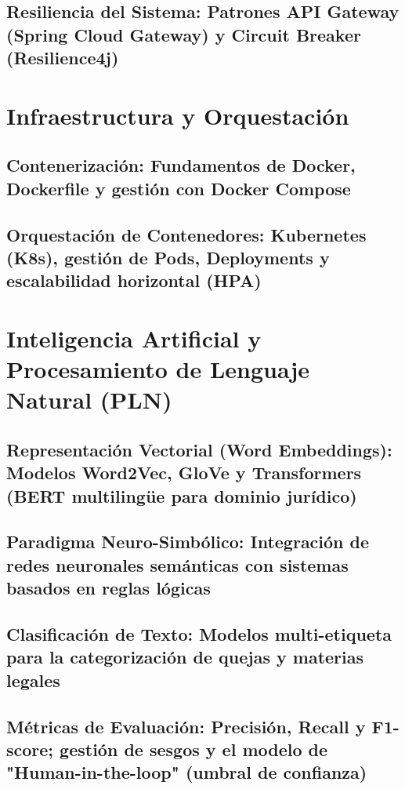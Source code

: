 \subsection{Resiliencia del Sistema: Patrones API Gateway (Spring Cloud Gateway) y Circuit Breaker (Resilience4j)}

\section{Infraestructura y Orquestación}
\subsection{Contenerización: Fundamentos de Docker, Dockerfile y gestión con Docker Compose}
\subsection{Orquestación de Contenedores: Kubernetes (K8s), gestión de Pods, Deployments y escalabilidad horizontal (HPA)}

\section{Inteligencia Artificial y Procesamiento de Lenguaje Natural (PLN)}
\subsection{Representación Vectorial (Word Embeddings): Modelos Word2Vec, GloVe y Transformers (BERT multilingüe para dominio jurídico)}
\subsection{Paradigma Neuro-Simbólico: Integración de redes neuronales semánticas con sistemas basados en reglas lógicas}
\subsection{Clasificación de Texto: Modelos multi-etiqueta para la categorización de quejas y materias legales}
\subsection{Métricas de Evaluación: Precisión, Recall y F1-score; gestión de sesgos y el modelo de "Human-in-the-loop" (umbral de confianza)}

